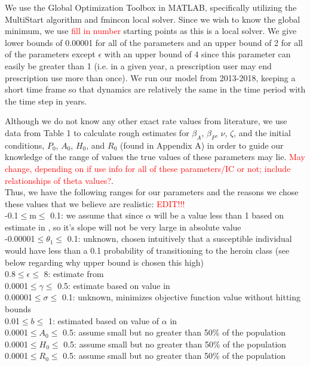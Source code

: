 \documentclass[12pt]{article}
\begin{document}
We use the Global Optimization Toolbox in MATLAB, specifically utilizing the MultiStart algorithm and fmincon local solver. Since we wish to know the global minimum, we use \textcolor{red}{fill in number} starting points as this is a local solver. We give lower bounds of 0.00001 for all of the parameters and an upper bound of 2 for all of the parameters except $\epsilon$ with an upper bound of 4 since this parameter can easily be greater than 1 (i.e. in a given year, a prescription user may end prescription use more than once). We run our model from 2013-2018, keeping a short time frame so that dynamics are relatively the same in the time period with the time step in years. 


Although we do not know any other exact rate values from literature, we use data from Table 1 to calculate rough estimates for $\beta_A$, $\beta_P$, $\nu$, $\zeta$, and the initial conditions, $P_0$, $A_0$, $H_0$, and $R_0$ (found in Appendix A) in order to guide our knowledge of the range of values the true values of these parameters may lie. \textcolor{red}{May change, depending on if use info for all of these parameters/IC or not; include relationships of theta values?}. \\

Thus, we have the following ranges for our parameters and the reasons we chose these values that we believe are realistic: \textcolor{red}{EDIT!!!} \\
-0.1$\leq$m$\leq$ 0.1: we assume that since $\alpha$ will be a value less than 1 based on estimate in \cite{Battista}, so it's slope will not be very large in absolute value \\
-0.00001$\leq$$\theta_1$$\leq$ 0.1: unknown, chosen intuitively that a susceptible individual would have less than a 0.1 probability of transitioning to the heroin class (see below regarding why upper bound is chosen this high) \\
0.8$\leq$$\epsilon$$\leq$ 8: estimate from \cite{Battista} \\
0.0001$\leq$$\gamma$$\leq$ 0.5: estimate based on value in \cite{Battista} \\
0.00001$\leq$$\sigma$$\leq$ 0.1: unknown, minimizes objective function value without hitting bounds \\
0.01$\leq$$b$$\leq$ 1: estimated based on value of $\alpha$ in \cite{Battista} \\
0.0001$\leq$$A_0$$\leq$ 0.5: assume small but no greater than 50\% of the population \\
0.0001$\leq$$H_0$$\leq$ 0.5: assume small but no greater than 50\% of the population \\
0.0001$\leq$$R_0$$\leq$ 0.5: assume small but no greater than 50\% of the population \\
\end{document}
